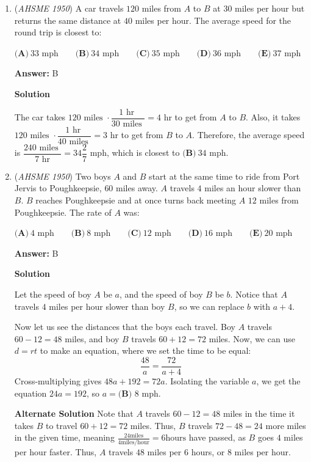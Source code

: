 \begin{enumerate}
 


	\item (\textit{AHSME 1950}) A car travels $120$ miles from $A$ to $B$ at $30$ miles per hour but returns the same distance at $40$ miles per hour. The average speed for the round trip is closest to:


 $\textbf{(A)}\ 33\text{ mph}\qquad\textbf{(B)}\ 34\text{ mph}\qquad\textbf{(C)}\ 35\text{ mph}\qquad\textbf{(D)}\ 36\text{ mph}\qquad\textbf{(E)}\ 37\text{ mph}$

 \textbf{Answer: }B



\textbf{Solution}

The car takes $120 \text{ miles }\cdot\dfrac{1 \text{ hr }}{30 \text{ miles }}=4 \text{ hr}$ to get from $A$ to $B$. Also, it takes $120 \text{ miles }\cdot\dfrac{1 \text{ hr }}{40 \text{ miles }}=3 \text{ hr}$ to get from $B$ to $A$. Therefore, the average speed is $\dfrac{240\text{ miles }}{7 \text{ hr}}=34\dfrac{2}{7}\text{ mph}$, which is closest to $\boxed{\textbf{(B)}\ 34\text{ mph}}$.

 


	\item (\textit{AHSME 1950}) Two boys $A$ and $B$ start at the same time to ride from Port Jervis to Poughkeepsie, $60$ miles away. $A$ travels $4$ miles an hour slower than $B$.  $B$ reaches Poughkeepsie and at once turns back meeting $A$ $12$ miles from Poughkeepsie. The rate of $A$ was:


 $\textbf{(A)}\ 4\text{ mph}\qquad\textbf{(B)}\ 8\text{ mph}\qquad\textbf{(C)}\ 12\text{ mph}\qquad\textbf{(D)}\ 16\text{ mph}\qquad\textbf{(E)}\ 20\text{ mph}$

 \textbf{Answer: }B



\textbf{Solution}

Let the speed of boy $A$ be $a$, and the speed of boy $B$ be $b$. Notice that $A$ travels $4$ miles per hour slower than boy $B$, so we can replace $b$ with $a+4$.

 Now let us see the distances that the boys each travel. Boy $A$ travels $60-12=48$ miles, and boy $B$ travels $60+12=72$ miles. Now, we can use $d=rt$ to make an equation, where we set the time to be equal: 
 \[\frac{48}{a}=\frac{72}{a+4}\]Cross-multiplying gives $48a+192=72a$. Isolating the variable $a$, we get the equation $24a=192$, so $a=\boxed{\textbf{(B) }8 \text{ mph}}$.

 \textbf{Alternate Solution} Note that $A$ travels $60-12=48$ miles in the time it takes $B$ to travel $60+12=72$ miles. Thus, $B$ travels $72-48=24$ more miles in the given time, meaning $\frac{24\text{miles}}{4\text{miles}/\text{hour}} = 6 \text{hours}$ have passed, as $B$ goes $4$ miles per hour faster. Thus, $A$ travels $48$ miles per $6$ hours, or $8$ miles per hour.


\end{enumerate}
